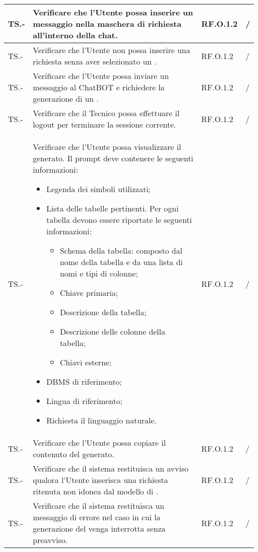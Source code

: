\begin{adjustwidth}{-0.5cm}{-0.5cm}
\begin{longtable}{|P{1.5cm}|>{\raggedright}P{7cm}|P{2.5cm}|>{\arraybackslash}P{1.5cm}|}
		\hline TS.- & Verificare che l'Utente possa inserire un messaggio nella maschera di richiesta all'interno della chat. & RF.O.1.2 & / \\ 
		\hline TS.- & Verificare che l'Utente non possa inserire una richiesta senza aver selezionato un . & RF.O.1.2 & / \\ 
		\hline TS.- & Verificare che l'Utente possa inviare un messaggio al ChatBOT e richiedere la generazione di un . & RF.O.1.2 & / \\ 
		\hline TS.- & Verificare che il Tecnico possa effettuare il logout per terminare la sessione corrente. & RF.O.1.2 & / \\ 
		\hline TS.- & Verificare che l'Utente possa visualizzare il  generato. Il prompt deve contenere le seguenti informazioni:
		\begin{itemize}
			\item Legenda dei simboli utilizzati;
			\item Lista delle tabelle pertinenti. Per ogni tabella devono essere riportate le seguenti informazioni:
			\begin{itemize}
				\item Schema della tabella: composto dal nome della tabella e da una lista di nomi e tipi di colonne;
				\item Chiave primaria;
				\item Descrizione della tabella;
				\item Descrizione delle colonne della tabella;
				\item Chiavi esterne;
			\end{itemize}
			\item DBMS di riferimento;
			\item Lingua di riferimento;
			\item Richiesta il linguaggio naturale.
		\end{itemize}
	 	& RF.O.1.2 & / \\ 
		\hline TS.- & Verificare che l'Utente possa copiare il contenuto del  generato. & RF.O.1.2 & / \\ 
		\hline TS.- & Verificare che il sistema restituisca un avviso qualora l'Utente inserisca una richiesta ritenuta non idonea dal modello di . & RF.O.1.2 & / \\ 
		\hline TS.- & Verificare che il sistema restituisca un messaggio di errore nel caso in cui la generazione del  venga interrotta senza preavviso. & RF.O.1.2 & / \\ 

\end{longtable}
\end{adjustwidth}
